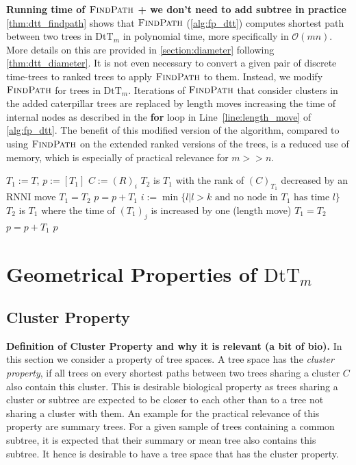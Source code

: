 \documentclass[11pt]{amsart}
\newcommand{\rnni}{\mathrm{RNNI}}
\newcommand{\findpath}{\textsc{FindPath}}
\newcommand{\rank}{\mathrm{rank}}
\newcommand{\dtt}{\mathrm{DtT}}
\renewcommand{\O}{\mathcal O}
\newcommand{\summary}[1]{\textbf{#1}} %
\begin{document}
\summary{Running time of $\findpath$ + we don't need to add subtree in practice}
\autoref{thm:dtt_findpath} shows that $\findpath$ (\autoref{alg:fp_dtt}) computes shortest path between two trees in $\dtt_m$ in polynomial time, more specifically in $\O(mn)$.
More details on this are provided in \autoref{section:diameter} following \autoref{thm:dtt_diameter}.
It is not even necessary to convert a given pair of discrete time-trees to ranked trees to apply $\findpath$ to them.
Instead, we modify $\findpath$ for trees in $\dtt_m$.
Iterations of $\findpath$ that consider clusters in the added caterpillar trees are replaced by length moves increasing the time of internal nodes as described in the \textbf{for} loop in Line~\ref{line:length_move} of \autoref{alg:fp_dtt}.
The benefit of this modified version of the algorithm, compared to using $\findpath$ on the extended ranked versions of the trees, is a reduced use of memory, which is especially of practical relevance for $m >> n$.

\begin{algorithm}[h]
	\caption{$\findpath$($T,R$)}
	\begin{algorithmic}[1]
		\label{alg:fp_dtt}
		\STATE $T_1 := T$, $p := [T_1]$
			\STATE $C:=(R)_i$
			\WHILE {$\rank((C)_{T_1})>k$}
					\STATE $T_2$ is $T_1$ with the rank of $(C)_{T_1}$ decreased by an $\rnni$ move
				\STATE $T_1 = T_2$
				\STATE $p = p+T_1$
			\ENDWHILE
			\ELSE
				\STATE $i := \min\{l | l>k \text{ and no node in } T_1 \text{ has time }l\}$
					\label{line:length_move}
					\STATE $T_2$ is $T_1$ where the time of $(T_1)_j$ is increased by one (length move)
					\STATE $T_1 = T_2$
					\STATE $p = p+T_1$
				\ENDFOR
			\ENDIF
		\ENDFOR
		\RETURN $p$
	\end{algorithmic}
\end{algorithm}


\section{Geometrical Properties of $\dtt_m$}

\subsection{Cluster Property}
\summary{Definition of Cluster Property and why it is relevant (a bit of bio).}
In this section we consider a property of tree spaces.
A tree space has the \emph{cluster property}, if all trees on every shortest paths between two trees sharing a cluster $C$ also contain this cluster.
This is desirable biological property as trees sharing a cluster or subtree are expected to be closer to each other than to a tree not sharing a cluster with them.
An example for the practical relevance of this property are summary trees.
For a given sample of trees containing a common subtree, it is expected that their summary or mean tree also contains this subtree.
It hence is desirable to have a tree space that has the cluster property.
\end{document}
